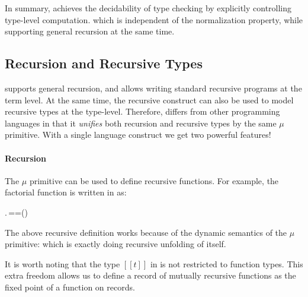 In summary, \name achieves the decidability of type checking by
explicitly controlling type-level computation.  which is independent
of the normalization property, while supporting general recursion at
the same time.

\subsection{Recursion and Recursive Types}

\name supports general recursion, and allows writing standard
recursive programs at the term level. At the same time, the recursive
construct can also be used to model recursive types at the type-level.
Therefore, \name differs from other programming languages in that it
\emph{unifies} both recursion and recursive types by the same $\mu$
primitive. With a single language construct we get two powerful
features!

\paragraph{Recursion}

The $\mu$ primitive can be used to define recursive functions.  For
example, the factorial function is written in \name as:
\begin{hscode}\SaveRestoreHook
{}%
%
%
\>[3]{}\mathrel{=}\mu\;\mathbin{:}\to {}.\,\;==\;\;\;\;\;\times\;\;(\mathbin{-}){}\<[E]%
\ColumnHook
\end{hscode}\resethooks
{}
The above recursive definition works because of the dynamic semantics of the
$\mu$ primitive: \ottusedrule{\ottdruleSXXMu{}} which is exactly doing
recursive unfolding of itself.

It is worth noting that the type $[[t]]$ in  is not
restricted to function types. This extra freedom allows us to define a
record of mutually recursive functions as the fixed point of a
function on records.


